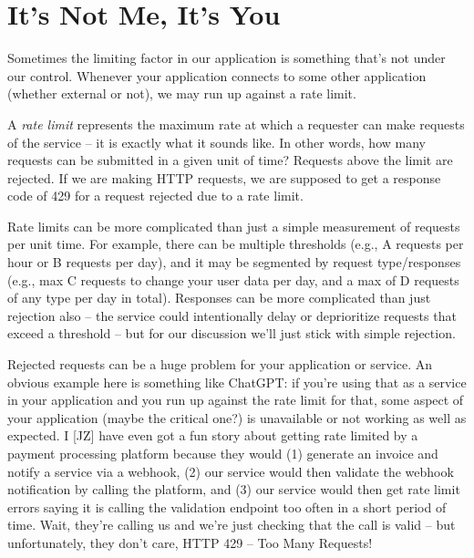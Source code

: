 




\section*{It's Not Me, It's You}

Sometimes the limiting factor in our application is something that's not under our control. Whenever your application connects to some other application (whether external or not), we may run up against a rate limit.

A \emph{rate limit} represents the maximum rate at which a requester can make requests of the service -- it is exactly what it sounds like. In other words, how many requests can be submitted in a given unit of time? Requests above the limit are rejected. If we are making HTTP requests, we are supposed to get a response code of 429 for a request rejected due to a rate limit.

Rate limits can be more complicated than just a simple measurement of requests per unit time. For example, there can be multiple thresholds (e.g., A requests per hour or B requests per day), and it may be segmented by request type/responses (e.g., max C requests to change your user data per day, and a max of D requests of any type per day in total). Responses can be more complicated than just rejection also -- the service could intentionally delay or deprioritize requests that exceed a threshold -- but for our discussion we'll just stick with simple rejection.

Rejected requests can be a huge problem for your application or service. An obvious example here is something like ChatGPT: if you're using that as a service in your application and you run up against the rate limit for that, some aspect of your application (maybe the critical one?) is unavailable or not working as well as expected. I [JZ] have even got a fun story about getting rate limited by a payment processing platform because they would (1) generate an invoice and notify a service via a webhook, (2) our service would then validate the webhook notification by calling the platform, and (3) our service would then get rate limit errors saying it is calling the validation endpoint too often in a short period of time. Wait, they're calling us and we're just checking that the call is valid -- but unfortunately, they don't care, HTTP 429 -- Too Many Requests! 

